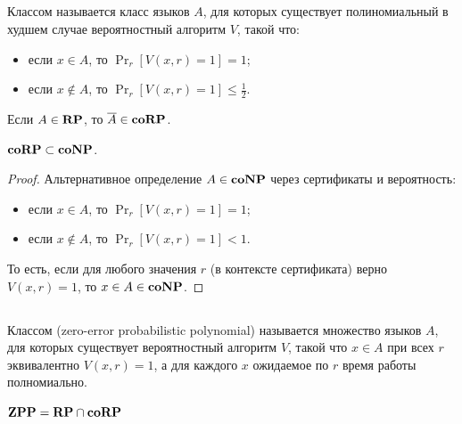 \subsection{\corp}

\begin{definition}
Классом \corp называется класс языков $A$, для которых существует полиномиальный в худшем случае вероятностный алгоритм $V$, такой что:

\begin{itemize}
    \item если $x \in A$, то $\Pr_r[V(x,r) = 1] = 1$;
    \item если $x \not\in A$, то $\Pr_r[V(x,r) = 1] \leq \frac{1}{2}$.
\end{itemize}
\end{definition}

\begin{note}
Если $A \in \textbf{RP}$, то $\overline{A} \in \textbf{coRP}$.
\end{note}

\begin{statement}
$\textbf{coRP} \subset \textbf{coNP}$.
\end{statement}

\begin{proof}
 Альтернативное определение $A \in \textbf{coNP}$ через сертификаты и вероятность:

\begin{itemize}
    \item если $x \in A$, то $\Pr_r[V(x,r) = 1] = 1$;
    \item если $x \not\in A$, то $\Pr_r[V(x,r) = 1] < 1$.
\end{itemize}

То есть, если для любого значения $r$ (в контексте \conp сертификата) верно $V(x, r) = 1$, то $x \in A \in \textbf{coNP}$.
\end{proof}

\subsection{\zpp}

\begin{definition}
Классом \zpp (zero-error probabilistic polynomial) называется множество языков $A$, для которых существует вероятностный алгоритм $V$, такой что $x \in A$ при всех $r$ эквивалентно $V(x, r) = 1$, а для каждого $x$ ожидаемое по $r$ время работы полномиально.
\end{definition}

\begin{statement}
$\textbf{ZPP} = \textbf{RP} \cap \textbf{coRP}$
\end{statement}

